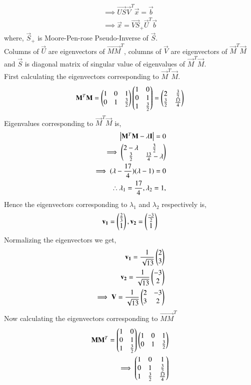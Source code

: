\documentclass[journal,12pt,twocolumn]{IEEEtran}
\begin{document}
\begin{align}
\implies \vec{US}\vec{V}^T\vec{x} = \vec{b}\\
\implies \vec{x} = \vec{VS}_+\vec{U}^T\vec{b} \label{eq:x}
\end{align}
where, $\vec{S}_+$ is Moore-Pen-rose Pseudo-Inverse of $\vec{S}$.\\
Columns of $\vec{U}$ are eigenvectors of $\vec{MM}^T$, columns of $\vec{V}$ are eigenvectors of $\vec{M}^T\vec{M}$ and $\vec{S}$ is diagonal matrix of singular value of eigenvalues of $\vec{M}^T\vec{M}$.\\
First calculating the eigenvectors corresponding to $\vec{M}^T\vec{M}$.
\begin{align}
\mathbf{M}^T\mathbf{M} =  \begin{pmatrix}1&0&1\\0&1&\frac{3}{2}\end{pmatrix} \begin{pmatrix}1&0\\0&1\\1&\frac{3}{2}\end{pmatrix} = \begin{pmatrix}2&\frac{3}{2}\\\frac{3}{2}&\frac{13}{4}\end{pmatrix}
\end{align}
Eigenvalues corresponding to $\vec{M}^T\vec{M}$  is,
\begin{align}
\begin{vmatrix}\mathbf{M}^T\mathbf{M}-\lambda\mathbf{I}\end{vmatrix} = 0\\
\implies \begin{pmatrix}2-\lambda&\frac{3}{2}\\\frac{3}{2}&\frac{13}{4}-\lambda\end{pmatrix}\\
\implies (\lambda-\frac{17}{4})(\lambda-1) = 0\\
\therefore \lambda_1 = \frac{17}{4}, \lambda_2 = 1, \label{eq:lambda2}
\end{align} 
Hence the eigenvectors corresponding to $\lambda_1$ and $\lambda_2$ respectively is,
\begin{align}
\mathbf{v_1} =\begin{pmatrix}\frac{2}{3}\\1\end{pmatrix}, \mathbf{v_2} =\begin{pmatrix}\frac{-3}{2}\\1\end{pmatrix}
\end{align}
Normalizing the eigenvectors we get,
\begin{align}
\mathbf{v_1} = \frac{1}{\sqrt{13}}\begin{pmatrix}2\\3\end{pmatrix}\\
\mathbf{v_2} = \frac{1}{\sqrt{13}}\begin{pmatrix}-3\\2\end{pmatrix}\\
\implies \mathbf{V} = \frac{1}{\sqrt{13}}\begin{pmatrix}2&-3\\3&2\end{pmatrix}\label{eq:V}
\end{align}
Now calculating the eigenvectors corresponding to $\vec{MM}^T$
\begin{align}
\mathbf{MM}^T = \begin{pmatrix}1&0\\0&1\\1&\frac{3}{2}\end{pmatrix}\begin{pmatrix}1&0&1\\0&1&\frac{3}{2}\end{pmatrix} \\\implies \begin{pmatrix}1&0&1\\0&1&\frac{3}{2}\\1&\frac{3}{2}&\frac{13}{4}\end{pmatrix}
\end{align}
\end{document}
